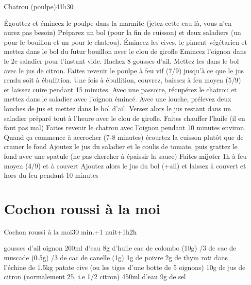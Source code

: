 {\begin{recette}{Chatrou (poulpe)}{4}{1h30}{}
\begin{preparation}
\etape Égouttez et émincez le poulpe dans la marmite (jetez cette eau là, vous n'en aurez pas besoin)
\etape Préparez un bol (pour la fin de cuisson) et deux saladiers (un pour le bouillon et un pour le chatrou). 
\etape Émincez les cives, le piment végétarien et mettez dans le bol du futur bouillon avec le clou de girofle
\etape Emincez l'oignon dans le 2e saladier pour l'instant vide.
\etape Hachez 8 gousses d'ail. Mettez les dans le bol avec le jus de citron. 
\etape Faites revenir le poulpe à feu vif (7/9) jusqu'à ce que le jus rendu soit à ébullition.
\etape Une fois à ébullition, couvrez, baissez à feu moyen (5/9) et laissez cuire pendant 15 minutes. 
\etape Avec une passoire, récupérez le chatrou et mettez dans le saladier avec l'oignon émincé. Avec une louche, prélevez deux louches de jus et mettez dans le bol d'ail. Versez alors le jus restant dans un saladier préparé tout à l'heure avec le clou de girofle.
\etape Faites chauffer l'huile (il en faut pas mal)
\etape Faites revenir le chatrou avec l'oignon pendant 10 minutes environ. Quand ça commence à accrocher (7-8 minutes) écourtez la cuisson plutôt que de cramer le fond
\etape Ajoutez le jus du saladier et le coulis de tomate, puis grattez le fond avec une spatule (ne pas chercher à épaissir la sauce)
\etape Faites mijoter 1h à feu moyen (4/9) et à couvert
\etape Ajoutez alors le jus du bol (+ail) et laissez à couvert et hors du feu pendant 10 minutes
\end{preparation}
\end{recette}


\section{Cochon roussi à la moi}
\begin{recette}{Cochon roussi à la moi}{}{30 min.+1 nuit+1h}{2h}
\begin{ingredients}
\ingredient[Marinade]
 gousses d'ail
 oignon
\ingredient 200ml d'eau
\ingredient 8g d'huile
 cac de colombo (10g)
/3 de cac de muscade (0.5g)
/3 de cac de canelle (1g)
\ingredient 1g de poivre
\ingredient 2g de thym
\ingredient[cuisson]
 roti dans l'échine de 1.5kg
 patate
 cive (ou les tiges d'une botte de 5 oignons)
\ingredient 10g de jus de citron (normalement 25, i.e 1/2 citron)
\ingredient 450ml d'eau
\ingredient 9g de sel
\end{ingredients}


\end{recette}}
